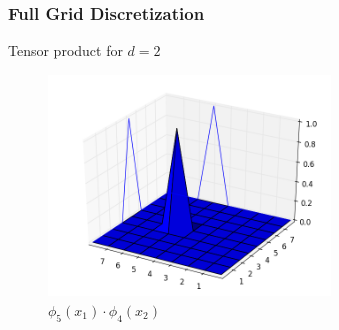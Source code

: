 \begin{frame}
  \frametitle{Full Grid Discretization}
  \topline
  \vspace{-10px}
  \begin{block}{Tensor product for $d = 2$}

    \begin{figure}[!htb]
      \centering
      \includegraphics[width=7.5cm]{images/tensor.png}
      \vspace{-12px}
      \caption{$\phi_5(x_1) \cdot \phi_4(x_2)$}
    \end{figure}
  \end{block}
\end{frame}

